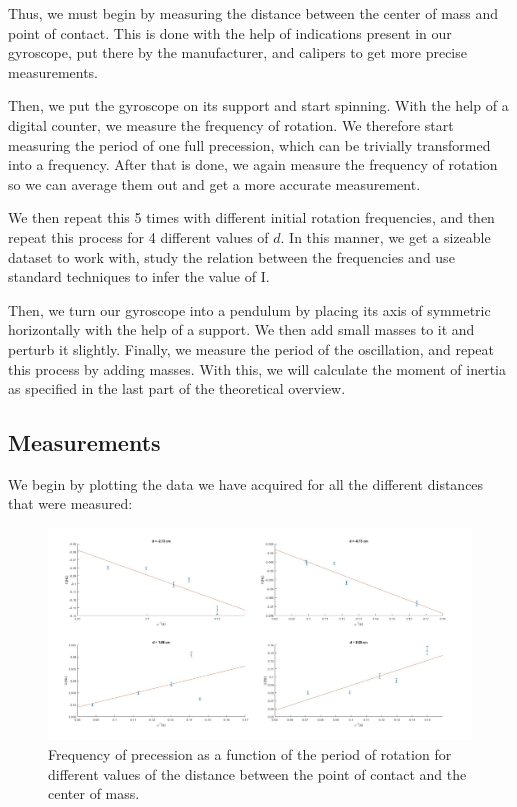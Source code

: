 \documentclass[a4paper,12pt]{article}
\begin{document}
Thus, we must begin by measuring the distance between the center of mass and point of contact. This is done with the help of indications present in our gyroscope, put there
by the manufacturer, and calipers to get more precise measurements.

Then, we put the gyroscope on its support and start spinning. With the help of a digital counter, we measure the frequency of rotation. 
We therefore start measuring the period of one full precession, which can be trivially transformed into a frequency. After that is done, we again measure the frequency of rotation so we can average them out and get a more accurate measurement.

We then repeat this 5 times with different initial rotation frequencies, and then repeat this process for 4 different values of $d$.
In this manner, we get a sizeable dataset to work with, study the relation between the frequencies and use standard techniques to infer the value of I. 

Then, we turn our gyroscope into a pendulum by placing its axis of symmetric horizontally with the help of a support. We then 
add small masses to it and perturb it slightly. Finally, we measure the period of the oscillation, and repeat this process by adding masses.
With this, we will calculate the moment of inertia as specified in the last part of the theoretical overview.

\subsection{Measurements}
We begin by plotting the data we have acquired for all the different distances that were measured:

\begin{figure}[h!]
	\label{foda}
	\caption{Frequency of precession as a function of the period of rotation for different values of the distance between the point of contact and the center of mass.}
	\includegraphics[width=\textwidth]{correct.jpg}
\end{figure} 
\end{document}
